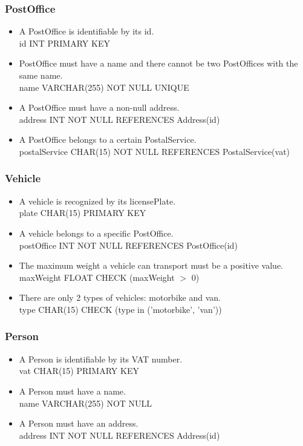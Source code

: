 \documentclass{report}[a4paper]
\theoremstyle{remark}
\begin{document}
\subsubsection{PostOffice}
\begin{itemize}
    \item A PostOffice is identifiable by its id. \\ id INT PRIMARY KEY
    \item PostOffice must have a name and there cannot be two PostOffices with the same name. \\ name VARCHAR(255) NOT NULL UNIQUE
    \item A PostOffice must have a non-null address. \\ address INT NOT NULL REFERENCES Address(id)
    \item A PostOffice belongs to a certain PostalService. \\ postalService CHAR(15) NOT NULL REFERENCES PostalService(vat)
\end{itemize}
\subsubsection{Vehicle}
\begin{itemize}
    \item A vehicle is recognized by its licensePlate. \\ plate CHAR(15) PRIMARY KEY
    \item A vehicle belongs to a specific PostOffice. \\ postOffice INT NOT NULL REFERENCES PostOffice(id)
    \item The maximum weight a vehicle can transport must be a positive value. \\ maxWeight FLOAT CHECK (maxWeight $>$ 0)
    \item There are only 2 types of vehicles: motorbike and van. \\ type CHAR(15) CHECK (type in ('motorbike', 'van'))
\end{itemize}
\subsubsection{Person}
\begin{itemize}
    \item A Person is identifiable by its VAT number. \\ vat CHAR(15) PRIMARY KEY
    \item A Person must have a name. \\ name VARCHAR(255) NOT NULL
    \item A Person must have an address. \\ address INT NOT NULL REFERENCES Address(id)
\end{itemize}
\end{document}
